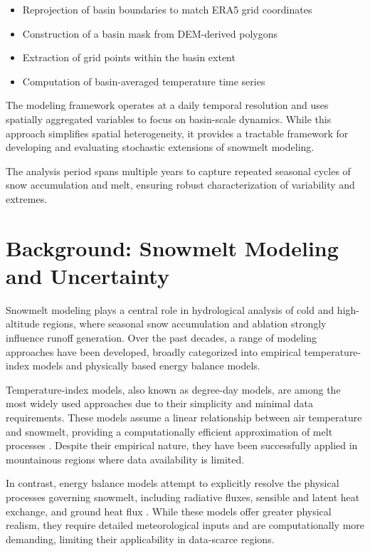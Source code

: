 \documentclass[11pt]{article}
\begin{document}
\begin{itemize}
	\item Reprojection of basin boundaries to match ERA5 grid coordinates
	\item Construction of a basin mask from DEM-derived polygons
	\item Extraction of grid points within the basin extent
	\item Computation of basin-averaged temperature time series
\end{itemize}

The modeling framework operates at a daily temporal resolution and uses spatially aggregated variables to focus on basin-scale dynamics. While this approach simplifies spatial heterogeneity, it provides a tractable framework for developing and evaluating stochastic extensions of snowmelt modeling.

The analysis period spans multiple years to capture repeated seasonal cycles of snow accumulation and melt, ensuring robust characterization of variability and extremes.


\section{Background: Snowmelt Modeling and Uncertainty}

Snowmelt modeling plays a central role in hydrological analysis of cold and high-altitude regions, where seasonal snow accumulation and ablation strongly influence runoff generation. Over the past decades, a range of modeling approaches have been developed, broadly categorized into empirical temperature-index models and physically based energy balance models.

Temperature-index models, also known as degree-day models, are among the most widely used approaches due to their simplicity and minimal data requirements. These models assume a linear relationship between air temperature and snowmelt, providing a computationally efficient approximation of melt processes \cite{Hock2003, Ohmura2001}. Despite their empirical nature, they have been successfully applied in mountainous regions where data availability is limited.

In contrast, energy balance models attempt to explicitly resolve the physical processes governing snowmelt, including radiative fluxes, sensible and latent heat exchange, and ground heat flux \cite{Marks1999, Essery2013}. While these models offer greater physical realism, they require detailed meteorological inputs and are computationally more demanding, limiting their applicability in data-scarce regions.
\end{document}
